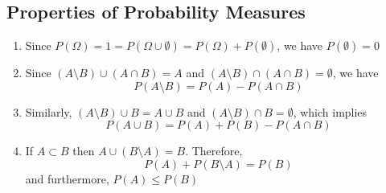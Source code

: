 \subsection{Properties of Probability Measures}
\begin{enumerate}[label=(\roman*)]
    \item Since $P(\Omega) = 1 = P(\Omega \cup \emptyset) = P(\Omega) + P(\emptyset)$, we have $P(\emptyset) = 0$
    \item Since $(A\setminus B) \cup (A \cap B) = A$ and $(A\setminus B) \cap (A \cap B) = \emptyset$, we have
    \[P(A \setminus B) = P(A) - P(A \cap B)\]
    \item Similarly, $(A \setminus B) \cup B = A \cup B$ and $(A \setminus B) \cap B = \emptyset$, which implies 
    \[P(A \cup B) = P(A) + P(B) - P(A \cap B)\]
    \item If $A \subset B$ then $A \cup (B \setminus A) = B$. Therefore, 
    \[P(A) + P(B \setminus A) = P(B)\]
    and furthermore,
    $P(A) \leq P(B)$
\end{enumerate}
